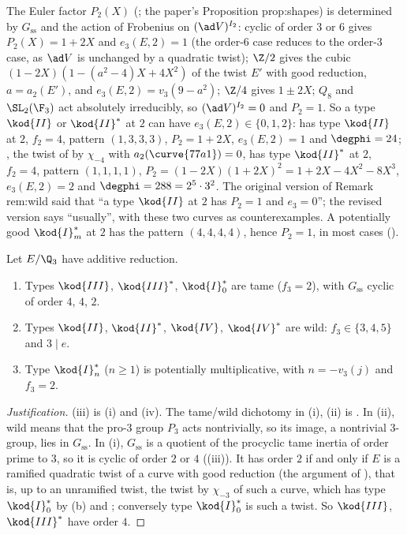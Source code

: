 \begin{paperlink}
The Euler factor $P_2(X)$ (; the paper's Proposition prop:shapes) is determined by $G_{\mathrm{ss}}$ and the action of
Frobenius on $(\ad V)^{I_2}$: cyclic of order $3$ or $6$ gives $P_2(X)=1+2X$ and $e_3(E,2)=1$ (the order-$6$ case reduces to the order-$3$
case, as $\ad V$ is unchanged by a quadratic twist); $\Z/2$ gives the cubic $(1-2X)(1-(a^2-4)X+4X^2)$ of the twist $E'$ with good reduction,
$a=a_2(E')$, and $e_3(E,2)=v_3(9-a^2)$; $\Z/4$ gives $1\pm2X$; $Q_8$ and $\SL_2(\F_3)$ act absolutely irreducibly, so $(\ad V)^{I_2}=0$ and
$P_2=1$. So a type $\kod{II}$ or $\kod{II}^*$ at $2$ can have $e_3(E,2)\in\{0,1,2\}$:  has type $\kod{II}$ at $2$, $f_2=4$, pattern
$(1,3,3,3)$, $P_2=1+2X$, $e_3(E,2)=1$ and $\degphi=24$; , the twist of  by $\chi_{-4}$ with $a_2(\curve{77a1})=0$, has
type $\kod{II}^*$ at $2$, $f_2=4$, pattern $(1,1,1,1)$, $P_2=(1-2X)(1+2X)^2=1+2X-4X^2-8X^3$, $e_3(E,2)=2$ and $\degphi=288=2^5\cdot3^2$. The
original version of Remark rem:wild said that ``a type $\kod{II}$ at $2$ has $P_2=1$ and $e_3=0$''; the revised version says ``usually'',
with these two curves as counterexamples. A potentially good $\kod{I}_m^*$ at $2$ has the pattern $(4,4,4,4)$, hence $P_2=1$, in most cases
().
\end{paperlink}

\begin{remark}\label{rem:reduction:wild-at-3}
Let $E/\Q_3$ have additive reduction.
\begin{enumerate}[label=(\roman*)]
\item Types $\kod{III}$, $\kod{III}^*$, $\kod{I}_0^*$ are tame ($f_3=2$), with $G_{\mathrm{ss}}$ cyclic of order $4$, $4$, $2$.
\item Types $\kod{II}$, $\kod{II}^*$, $\kod{IV}$, $\kod{IV}^*$ are wild: $f_3\in\{3,4,5\}$ and $3\mid e$.
\item Type $\kod{I}_n^*$ ($n\ge1$) is potentially multiplicative, with $n=-v_3(j)$ and $f_3=2$.
\end{enumerate}
\end{remark}

\begin{proof}[Justification]
(iii) is (i) and (iv). The tame/wild dichotomy in (i), (ii) is
. In (ii), wild means that the pro-$3$ group $P_3$ acts nontrivially, so its image, a nontrivial
$3$-group, lies in $G_{\mathrm{ss}}$. In (i), $G_{\mathrm{ss}}$ is a quotient of the procyclic tame inertia of order prime to $3$, so it is
cyclic of order $2$ or $4$ ((iii)). It has order $2$ if and only if $E$ is a ramified quadratic twist of a
curve with good reduction (the argument of ), that is, up to an unramified twist, the twist by $\chi_{-3}$
of such a curve, which has type $\kod{I}_0^*$ by (b) and ;
conversely type $\kod{I}_0^*$ is such a twist. So $\kod{III}$, $\kod{III}^*$ have order $4$.
\end{proof}

